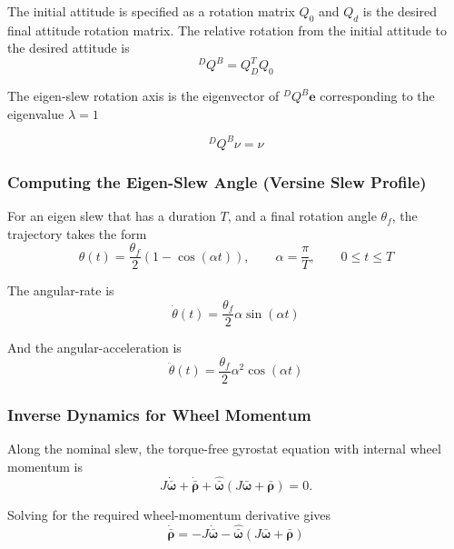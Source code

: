 \documentclass[conference,onecolumn,draftclsnofoot]{IEEEtran}
\begin{document}
The initial attitude is specified as a rotation matrix \(Q_0\) and \(Q_d\) is the desired
final attitude rotation matrix. The relative rotation from the initial attitude
to the desired attitude is
\begin{equation}
{}^DQ^B
=
Q_D^T Q_0
\end{equation}

The eigen-slew rotation axis is the eigenvector of ${}^DQ^B\mathbf e$
corresponding to the eigenvalue \(\lambda=1\)

\begin{equation}
{}^DQ^B\nu
=
\nu
\end{equation}

\subsubsection{Computing the Eigen-Slew Angle (Versine Slew Profile)}

For an eigen slew that has a duration \(T\), and a final rotation angle $\theta_f$, the trajectory takes the form
\begin{equation}
\theta(t)=\frac{\theta_f}{2}\left(1-\cos(\alpha t)\right),\qquad \alpha=\frac{\pi}{T}, \qquad 0\leq t\leq T
\end{equation}

The angular-rate is
\begin{equation}
\dot{\theta}(t)
=
\frac{\theta_f}{2}
\alpha
\sin(\alpha t)
\end{equation}

And the angular-acceleration is
\begin{equation}
\ddot{\theta}(t)
=
\frac{\theta_f}{2}
\alpha^2
\cos(\alpha t)
\end{equation}

\subsubsection{Inverse Dynamics for Wheel Momentum}

Along the nominal slew, the torque-free gyrostat equation with internal wheel
momentum is
\begin{equation}
J\dot{\bar{\boldsymbol{\omega}}}
+
\dot{\bar{\boldsymbol{\rho}}}
+
\hat{\bar{\boldsymbol{\omega}}}
\left(
J\bar{\boldsymbol{\omega}}+
\bar{\boldsymbol{\rho}}\right)
=
0.
\end{equation}

Solving for the required wheel-momentum derivative gives
\begin{equation}
\dot{\bar{\boldsymbol{\rho}}}
=
-
J\dot{\bar{\boldsymbol{\omega}}}
-
\hat{\bar{\boldsymbol{\omega}}}
\left(
J\bar{\boldsymbol{\omega}}+
\bar{\boldsymbol{\rho}}\right)
\end{equation}
\end{document}

